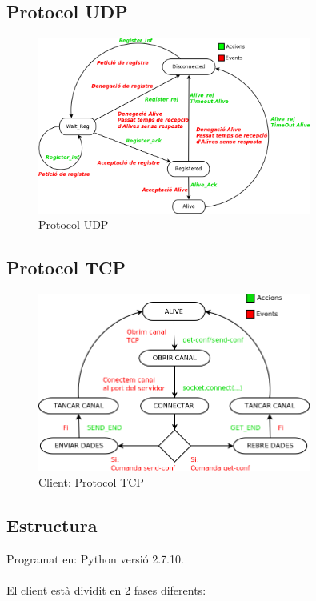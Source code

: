 \documentclass[11pt]{article}
\begin{document}
\subsection{Protocol UDP}
\begin{figure}[h]
    \centering
    \includegraphics[width=0.8\textwidth]{UDP_diagram.png}
    \caption{Protocol UDP}
    \label{fig:ProtcolUDP}
\end{figure}
\newpage
\subsection{Protocol TCP}
\begin{figure}[h]
    \centering
    \includegraphics[width=0.8\textwidth]{clientTCP.png}
    \caption{Client: Protocol TCP}
    \label{fig:PrtocolTCP}
\end{figure}
\newpage
\justify
\subsection{Estructura}
Programat en: Python versió 2.7.10.\\\\
El client està dividit en 2 fases diferents:
\end{document}
